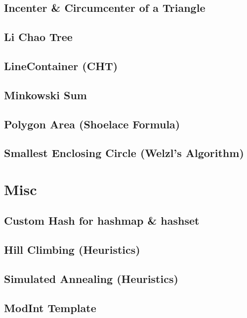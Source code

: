 \subsection{Incenter \& Circumcenter of a Triangle}

\subsection{Li Chao Tree}

\subsection{LineContainer (CHT)}

\subsection{Minkowski Sum}

\subsection{Polygon Area (Shoelace Formula)}

\subsection{Smallest Enclosing Circle (Welzl's Algorithm)}

\section{Misc}
\subsection{Custom Hash for hashmap \& hashset}

\subsection{Hill Climbing (Heuristics)}

\subsection{Simulated Annealing (Heuristics)}

\subsection{ModInt Template}

